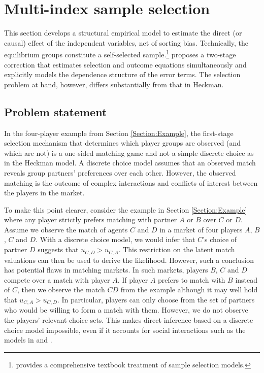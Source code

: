 \section{Multi-index sample selection} \label{Section:Multi-indexSS}

This section develops a structural empirical model to estimate the direct (or causal) effect of the independent variables, net of sorting bias. Technically, the equilibrium groups constitute a self-selected sample.\footnote{\citet[Chapter 17]{Wooldridge2002} provides a comprehensive textbook treatment of sample selection models.} \citet{Heckman1979} proposes a two-stage correction that estimates selection and outcome equations simultaneously and explicitly models the dependence structure of the error terms. The selection problem at hand, however, differs substantially from that in Heckman.


\subsection{Problem statement} 

In the four-player example from Section \ref{Section:Example}, the first-stage selection mechanism that determines which player groups are observed (and which are not) is a one-sided matching game and not a simple discrete choice as in the Heckman model. A discrete choice model assumes that an observed match reveals group partners' preferences over each other. However, the observed matching is the outcome of complex interactions and conflicts of interest between the players in the market. 

To make this point clearer, consider the example in Section \ref{Section:Example} where any player strictly prefers matching with partner $A$ or $B$ over $C$ or $D$. Assume we observe the match of agents $C$ and $D$ in a market of four players $A$, $B$, $C$ and $D$. With a discrete choice model, we would infer that $C$'s choice of partner $D$ suggests that $u_{C,D}>u_{C,A}$. This restriction on the latent match valuations can then be used to derive the likelihood. However, such a conclusion has potential flaws in matching markets. In such markets, players $B$, $C$ and $D$ compete over a match with player $A$. If player $A$ prefers to match with $B$ instead of $C$, then we observe the match $CD$ from the example although it may well hold that $u_{C,A}>u_{C,D}$. In particular, players can only choose from the set of partners who would be willing to form a match with them. However, we do not observe the players' relevant choice sets. This makes direct inference based on a discrete choice model %
impossible, even if it accounts for social interactions such as the models in \citet{Brock2007} and \citet{Ciliberto2009}.




